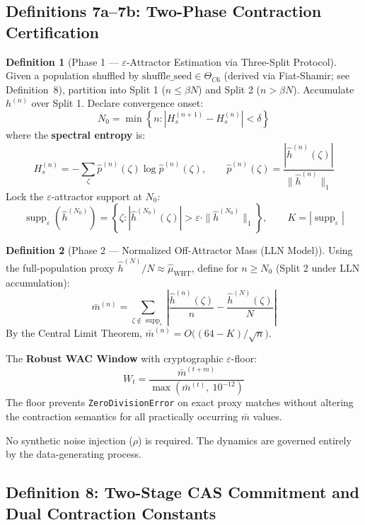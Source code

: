 \documentclass[12pt,letterpaper]{article}
\theoremstyle{definition}
\newtheorem{definition}{Definition}[section]
\theoremstyle{plain}
\theoremstyle{remark}
\newcommand{\supp}{\operatorname{supp}}
\newcommand{\TC}{\Theta_{C6}}
\newcommand{\hhat}{\hat{h}}
\newcommand{\mbar}{\bar{m}}
\begin{document}
\subsection{Definitions 7a--7b: Two-Phase Contraction Certification}

\begin{definition}[Phase 1 --- $\varepsilon$-Attractor Estimation via Three-Split Protocol]
Given a population shuffled by $\mathrm{shuffle\_seed} \in \TC$ (derived via Fiat-Shamir; see Definition~8), partition into Split 1 ($n \le \beta N$) and Split 2 ($n > \beta N$). Accumulate $h^{(n)}$ over Split 1. Declare convergence onset:
\[
  N_0 = \min\!\left\{n : |H_s^{(n+1)} - H_s^{(n)}| < \delta \right\}
\]
where the \textbf{spectral entropy} is:
\[
  H_s^{(n)} = -\sum_\zeta \hat{p}^{(n)}(\zeta)\log \hat{p}^{(n)}(\zeta),
  \qquad
  \hat{p}^{(n)}(\zeta) = \frac{|\hhat^{(n)}(\zeta)|}{\|\hhat^{(n)}\|_1}
\]
Lock the $\varepsilon$-attractor support at $N_0$:
\[
  \supp_\varepsilon(\hhat^{(N_0)}) = \left\{ \zeta : |\hhat^{(N_0)}(\zeta)| > \varepsilon \cdot \|\hhat^{(N_0)}\|_1 \right\},
  \qquad K = |\supp_\varepsilon|
\]
\end{definition}

\begin{definition}[Phase 2 --- Normalized Off-Attractor Mass (LLN Model)]
Using the full-population proxy $\hhat^{(N)}/N \approx \hat{\mu}_{\mathrm{WHT}}$, define for $n \ge N_0$ (Split 2 under LLN accumulation):
\[
  \mbar^{(n)} = \sum_{\zeta \notin \supp_\varepsilon} \left| \frac{\hhat^{(n)}(\zeta)}{n} - \frac{\hhat^{(N)}(\zeta)}{N} \right|
\]
By the Central Limit Theorem, $\mbar^{(n)} = O\!\bigl((64-K)/\sqrt{n}\bigr)$.

The \textbf{Robust WAC Window} with cryptographic $\varepsilon$-floor:
\[
  W_t = \frac{\mbar^{(t+m)}}{\max\!\left(\mbar^{(t)},\ 10^{-12}\right)}
\]
The floor prevents \texttt{ZeroDivisionError} on exact proxy matches without altering the contraction semantics for all practically occurring $\mbar$ values.

No synthetic noise injection ($\rho$) is required. The dynamics are governed entirely by the data-generating process.
\end{definition}

\subsection{Definition 8: Two-Stage CAS Commitment and Dual Contraction Constants}
\end{document}
